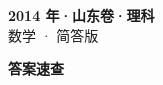 \documentclass[zihao=-4, a4paper]{ctexart}
\begin{document}
\begin{center}
  {\Large\bfseries 2014 年·山东卷·理科}\\[4pt]
  {\large 数学 · 简答版}
\end{center}
\medskip
{}

\clearpage
{}
\begin{center}{\Large\bfseries 答案速查}\end{center}
\medskip

\end{document}
